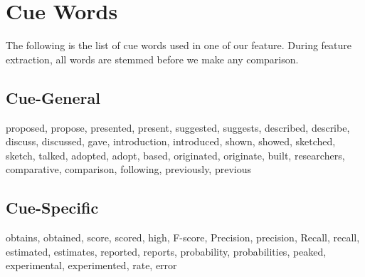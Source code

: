 \chapter{Cue Words}
\label{cuewords}
The following is the list of cue words used in one of our feature. During feature extraction, all words are stemmed before we make any comparison.
\section{Cue-General}
proposed, propose, presented, present, suggested, suggests, described, describe, discuss, discussed, gave, introduction, introduced, shown, showed, sketched, sketch, talked, adopted, adopt, based, originated, originate, built, researchers, comparative, comparison, following, previously, previous

\section{Cue-Specific}
obtains, obtained, score, scored, high, F-score, Precision, precision, Recall, recall, estimated, estimates, reported, reports, probability, probabilities, peaked, experimental, experimented, rate, error